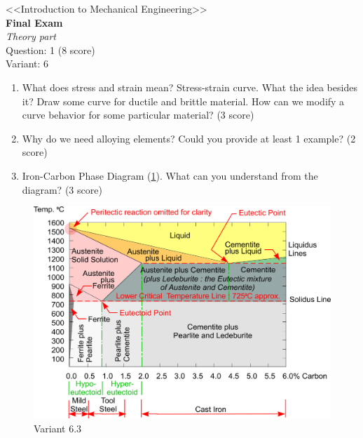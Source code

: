 \documentclass[12pt]{article}
\newcommand\pic[1]{(\cref{#1})} %
\newcommand\ttask[2]{
        \begin{center}
            \LARGE <<Introduction to Mechanical Engineering>> \\ \textbf{Final Exam} \\ \textit{Theory part} \\
            Question: 1 (8 score) \\ Variant: #1
        \end{center}
    #2
    \newpage
    }
\begin{document}
\ttask{6}{
\begin{enumerate}
    \item What does stress and strain mean? Stress-strain curve. What the idea besides it? Draw some curve for ductile and brittle material. How can we modify a curve behavior for some particular material? (3 score)
    \item Why do we need alloying elements? Could you provide at least 1 example? (2 score)
    \item Iron-Carbon Phase Diagram \pic{fig:resources_THEORY/quiz1_task6.png}. What can you understand from the diagram? (3 score)
\end{enumerate}
\begin{figure}[H]
    \centering\includegraphics[height=8cm,width=1\textwidth,keepaspectratio]{resources_THEORY/quiz1_task6.png}
    \caption{Variant 6.3}
    \label{fig:resources_THEORY/quiz1_task6.png}
\end{figure}}
\end{document}
